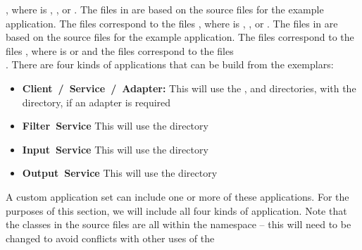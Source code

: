 , where  is ,
,  or .
The files in  are based on the source files for the
 example application.
The files  correspond to the files
, where  is ,
,  or .
The files in  are based on the source files for the
 example application.
The files  correspond to the files
, where  is  or
 and the files  correspond to the
files\\
.
\secondaryEnd{}
There are four kinds of applications that can be build from the exemplars:
\begin{itemize}
\item \textbf{Client~/~Service~/~Adapter:} This will use the
,  and
 directories, with the 
directory, if an adapter is required
\item \textbf{Filter~Service} This will use the 
directory
\item \textbf{Input~Service} This will use the 
directory
\item \textbf{Output~Service} This will use the 
directory 
\end{itemize}
A custom application set can include one or more of these applications.
For the purposes of this section, we will include all four kinds of application.
\tertiaryEnd{}
Note that the classes in the source files are all within the 
namespace -- this will need to be changed to avoid conflicts with other uses of the
